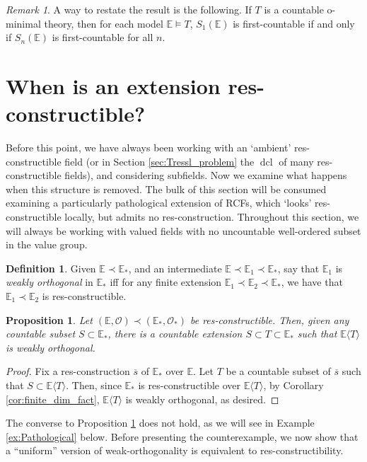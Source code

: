 \documentclass{amsart}
\newtheorem{proposition}[theorem]{Proposition}
\theoremstyle{remark}
\newtheorem{remark}[theorem]{Remark}
\theoremstyle{definition}
\newtheorem{definition}[theorem]{Definition}
\theoremstyle{plain}
\newcommand{\bE}{\mathbb E}
\newcommand{\cO}{\mathcal O}
\DeclareMathOperator{\dcl}{\mathrm{dcl}}
\theoremstyle{plain}
\begin{document}
\begin{remark}
    A way to restate the result is the following. If $T$ is a countable o-minimal theory, then for each model $\bE \models T$, $S_1(\bE)$ is first-countable if and only if $S_n(\bE)$ is first-countable for all $n$. 
\end{remark}

\section{When is an extension res-constructible?}\label{sec:removing_ambient_res_construction}
Before this point, we have always been working with an `ambient' res-constructible field (or in Section \ref{sec:Tressl_problem} the $\dcl$ of many res-constructible fields), and considering subfields. Now we examine what happens when this structure is removed. The bulk of this section will be consumed examining a particularly pathological extension of RCFs, which `looks' res-constructible locally, but admits no res-construction. Throughout this section, we will always be working with valued fields with no uncountable well-ordered subset in the value group.

\begin{definition}
Given $\bE \prec \bE_*$, and an intermediate $\bE \prec \bE_1 \prec \bE_*$, say that $\bE_1$ is \textit{weakly orthogonal} in $\bE_*$ iff for any finite extension $\bE_1 \prec \bE_2 \prec \bE_*$, we have that $\bE_1 \prec \bE_2$ is res-constructible.
\end{definition}

\begin{proposition}\label{prop:necessary_condition}
Let $(\bE,\cO) \prec (\bE_*,\cO_*)$ be res-constructible. Then, given any countable subset $S \subset \bE_*$, there is a countable extension $S \subset T \subset \bE_*$ such that $\bE\langle T \rangle$ is weakly orthogonal.
\end{proposition} 
\begin{proof}
Fix a res-construction $\overline{s}$ of $\bE_*$ over $\bE$. Let $T$ be a countable subset of $\overline{s}$ such that $S \subset \bE\langle T \rangle$. Then, since $\bE_*$ is res-constructible over $\bE\langle T \rangle$, by Corollary \ref{cor:finite_dim_fact}, $\bE\langle T \rangle$ is weakly orthogonal, as desired.
\end{proof}

The converse to Proposition \ref{prop:necessary_condition} does not hold, as we will see in Example \ref{ex:Pathological} below. Before presenting the counterexample, we now show that a ``uniform'' version of weak-orthogonality is equivalent to res-constructibility.
\end{document}
